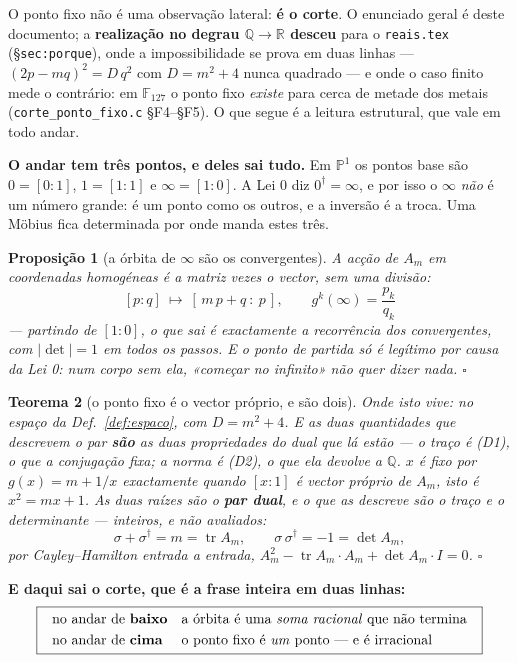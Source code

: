 \documentclass[11pt,a4paper]{article}
\newtheorem{teorema}{Teorema}
\newtheorem{proposicao}[teorema]{Proposição}
\newcommand{\code}[1]{\texttt{\small #1}}
\newcommand{\abs}[1]{\lvert #1\rvert}
\newcommand{\dg}{^{\dagger}}
\begin{document}
\noindent O ponto fixo não é uma observação lateral: \textbf{é o corte}. O
enunciado geral é deste documento; a \textbf{realização no degrau
$\mathbb{Q}\to\mathbb{R}$ desceu} para o \code{reais.tex}
(§\code{sec:porque}), onde a impossibilidade se prova em duas linhas ---
$(2p-mq)^{2}=D\,q^{2}$ com $D=m^{2}+4$ nunca quadrado --- e onde o caso finito
mede o contrário: em $\mathbb{F}_{127}$ o ponto fixo \emph{existe} para cerca de
metade dos metais (\code{corte\_ponto\_fixo.c} §F4--§F5). O que segue é a
leitura estrutural, que vale em todo andar.

\medskip
\noindent\textbf{O andar tem três pontos, e deles sai tudo.} Em $\mathbb{P}^1$ os
pontos base são $0=[0:1]$, $1=[1:1]$ e $\infty=[1:0]$. A Lei 0 diz $0\dg=\infty$, e
por isso o $\infty$ \emph{não} é um número grande: é um ponto como os outros, e a
inversão é a troca. Uma Möbius fica determinada por onde manda estes três.

\begin{proposicao}[a órbita de $\infty$ são os convergentes]\label{prop:orbita}
A acção de $A_m$ em coordenadas homogéneas é a matriz vezes o vector, \emph{sem uma
divisão}:
\[
\boxed{\;[p:q]\ \longmapsto\ [\,m\,p+q\ :\ p\,],
\qquad
g^{k}(\infty)=\frac{p_k}{q_k}\;}
\]
--- partindo de $[1:0]$, o que sai é exactamente a recorrência dos convergentes, com
$\abs{\det}=1$ em todos os passos. \emph{E o ponto de partida só é legítimo por causa
da Lei 0}: num corpo sem ela, «começar no infinito» não quer dizer nada. $\square$
\end{proposicao}

\begin{teorema}[o ponto fixo é o vector próprio, e são dois]\label{thm:fixo-dual}
\emph{Onde isto vive:} no espaço da Def.~\ref{def:espaco}, com $D=m^{2}+4$. E as duas
quantidades que descrevem o par \textbf{são} as duas propriedades do dual que lá estão ---
o traço é (D1), o que a conjugação fixa; a norma é (D2), o que ela devolve a $\mathbb{Q}$.
$x$ é fixo por $g(x)=m+1/x$ exactamente quando $[x:1]$ é vector próprio de $A_m$,
isto é $x^{2}=mx+1$. As duas raízes são o \textbf{par dual}, e o que as descreve são
o traço e o determinante --- \emph{inteiros}, e não avaliados:
\[
\sigma+\sigma\dg=m=\operatorname{tr}A_m,
\qquad
\sigma\,\sigma\dg=-1=\det A_m ,
\]
por Cayley--Hamilton entrada a entrada, $A_m^{2}-\operatorname{tr}A_m\cdot A_m+\det
A_m\cdot I=0$. $\square$
\end{teorema}

\medskip
\noindent\textbf{E daqui sai o corte, que é a frase inteira em duas linhas:}
\[
\boxed{\;\begin{array}{ll}
\text{no andar de \textbf{baixo}} & \text{a órbita é uma \emph{soma racional} que não
termina}\\[3pt]
\text{no andar de \textbf{cima}} & \text{o ponto fixo é \emph{um} ponto --- e é
irracional}
\end{array}\;}
\]
\end{document}
